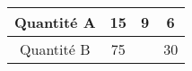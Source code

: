\begin{tabular}{|c|c|c|c|}
\hline
Quantité A & 15 & 9 & 6 \\ \hline
Quantité B & 75 & \kern1cm & 30 \\ \hline
\end{tabular}

